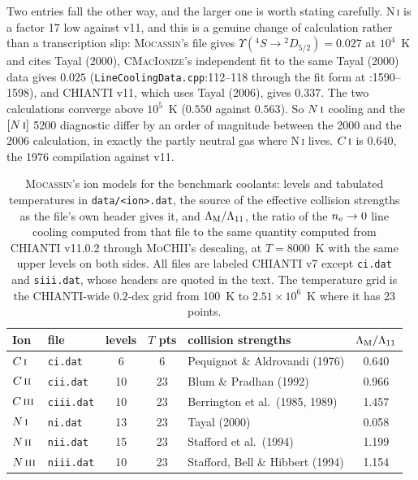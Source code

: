 \documentclass[english,a4paper]{my_memo}
\newcommand{\code}[1]{\texttt{#1}}
\newcommand{\MoCHII}{\textsc{MoCHII}}
\newcommand{\Mocassin}{\textsc{Mocassin}}
\newcommand{\CMI}{\textsc{CMacIonize}}
\newcommand{\NI}{N\,\textsc{i}}
\newcommand{\NII}{N\,\textsc{ii}}
\newcommand{\NIII}{N\,\textsc{iii}}
\newcommand{\CI}{C\,\textsc{i}}
\newcommand{\CII}{C\,\textsc{ii}}
\newcommand{\CIII}{C\,\textsc{iii}}
\newcommand{\nel}{n_{\rm e}}
\begin{document}
Two entries fall the other way, and the larger one is worth stating carefully.
\NI{} is a factor 17 low against v11, and this is a genuine change of
calculation rather than a transcription slip: \Mocassin{}'s file gives
$\Upsilon(^4S \to {}^2D_{5/2}) = 0.027$ at $10^4$~K and cites Tayal (2000),
\CMI{}'s independent fit to the same Tayal (2000) data gives $0.025$
(\code{LineCoolingData.cpp}:112--118 through the fit form at :1590--1598), and
CHIANTI v11, which uses Tayal (2006), gives $0.337$.  The two calculations
converge above $10^5$~K ($0.550$ against $0.563$).  So $\NI{}$ cooling and the
$[\NI{}]$ 5200 diagnostic differ by an order of magnitude between the 2000 and
the 2006 calculation, in exactly the partly neutral gas where \NI{} lives.
$\CI{}$ is $0.640$, the 1976 compilation against v11.

\begin{table}[htbp]
\centering
\footnotesize
\caption{\Mocassin{}'s ion models for the benchmark coolants: levels and
tabulated temperatures in \code{data/<ion>.dat}, the source of the effective
collision strengths as the file's own header gives it, and
$\Lambda_{\rm M}/\Lambda_{11}$, the ratio of the $\nel \to 0$ line cooling
computed from that file to the same quantity computed from CHIANTI v11.0.2
through \MoCHII{}'s descaling, at $T = 8000$~K with the same upper levels on
both sides.  All files are labeled CHIANTI v7 except \code{ci.dat} and
\code{siii.dat}, whose headers are quoted in the text.  The temperature grid is
the CHIANTI-wide $0.2$-dex grid from 100~K to $2.51\times10^{6}$~K where it has
23 points.}
\label{tab:mocassinions}
\begin{tabular}{llcclc}
\toprule
Ion & file & levels & $T$ pts & collision strengths & $\Lambda_{\rm M}/\Lambda_{11}$ \\
\midrule
$\CI{}$    & \code{ci.dat}    &  6 &  6 & Pequignot \& Aldrovandi (1976)      & 0.640 \\
$\CII{}$   & \code{cii.dat}   & 10 & 23 & Blum \& Pradhan (1992)              & 0.966 \\
$\CIII{}$  & \code{ciii.dat}  & 10 & 23 & Berrington et al.\ (1985, 1989)     & 1.457 \\
$\NI{}$    & \code{ni.dat}    & 13 & 23 & Tayal (2000)                        & 0.058 \\
$\NII{}$   & \code{nii.dat}   & 15 & 23 & Stafford et al.\ (1994)             & 1.199 \\
$\NIII{}$  & \code{niii.dat}  & 10 & 23 & Stafford, Bell \& Hibbert (1994)    & 1.154 \\

\end{tabular}
\end{table}
\end{document}
